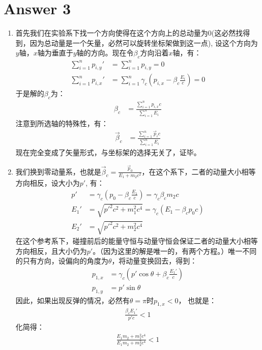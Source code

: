 \section*{Answer 3}
\begin{enumerate}
	\item 首先我们在实验系下找一个方向使得在这个方向上的总动量为0(这必然找得到，因为总动量是一个矢量，必然可以旋转坐标架做到这一点), 设这个方向为\(y\)轴，\(x\)轴为垂直于\(y\)轴的方向。现在令\(\beta_c\)方向沿着\(x\)轴，有：
	\begin{align*}
		\sum_{i=1}^{n} p_{i,y}' &= \sum_{i=1}^{n} p_{i,y}= 0 \\
		\sum_{i=1}^{n} p_{i,x}' &= \sum_{i=1}^{n} \gamma_c (p_{i,x} - \beta_c \frac{E_{i}}{c}) = 0 
	\end{align*}
	于是解的\(\beta_c\)为：
	\begin{align*}
		\beta_c &= \frac{\sum_{i=1}^{n} p_{i,x}c}{\sum_{i=1}^{n} E_{i}} 
	\end{align*}
	注意到所选轴的特殊性，有：
	\begin{align*}
		\vec{\beta}_c &= \frac{\sum_{i=1}^{n} \vec{p}_{i}c}{\sum_{i=1}^{n} E_{i}} 
	\end{align*}
	现在完全变成了矢量形式，与坐标架的选择无关了，证毕。
	\item 我们换到零动量系，也就是\(\vec{\beta}_c = \frac{\vec{p}_0 }{E_1 + m_2c^2}\)，在这个系下，二者的动量大小相等方向相反，设大小为\(p'\), 有：
	\begin{align*}
		p' &= \gamma_c (p_0- \beta_c \frac{E_{1}}{c}) = \gamma_c \beta_c m_2 c \\
		E_1' &= \sqrt{p'^2c^2 + m_1^2c^4} = \gamma_c (E_1 -\beta_c p_0 c)\\
		E_2' &= \sqrt{p'^2c^2 + m_2^2c^4}
	\end{align*}
	在这个参考系下，碰撞前后的能量守恒与动量守恒会保证二者的动量大小相等方向相反，且大小仍为\(p'\)。（因为这里的解是唯一的，有两个方程。）唯一不同的只有方向，设偏向的角度为\(\theta\)，将动量变换回去，得到：
	\begin{align*}
		p_{1,x} &= \gamma_c ( p' \cos \theta + \beta_c \frac{E_{1}'}{c}) \\
		p_{1,y} &= p' \sin \theta  
	\end{align*}
	因此，如果出现反弹的情况，必然有\(\theta = \pi\)时\(p_{1,x} < 0\)， 也就是：
	\begin{align*}
		\frac{\beta_c E_1'}{p' c} < 1
	\end{align*}
	化简得：
	\begin{align*}
		\frac{E_1 m_2 + m_1^2 c^4}{E_1 m_2+ m_2^2 c^4} < 1 

\end{align*}
\end{enumerate}
